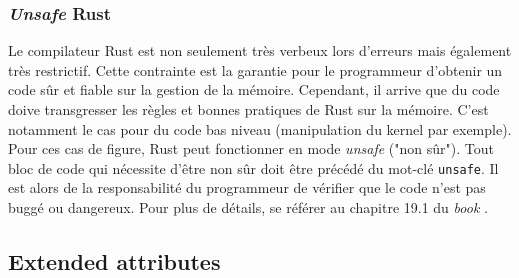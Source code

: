 \subsubsection{\textit{Unsafe} Rust}
Le compilateur Rust est non seulement très verbeux lors d'erreurs mais également très restrictif. 
Cette contrainte est la garantie pour le programmeur d'obtenir un code sûr et fiable sur la gestion 
de la mémoire. Cependant, il arrive que du code doive transgresser les règles et bonnes pratiques
de Rust sur la mémoire. C'est notamment le cas pour du code bas niveau (manipulation du kernel par 
exemple). Pour ces cas de figure, Rust peut fonctionner en mode \textit{unsafe} ("non sûr"). Tout 
bloc de code qui nécessite d'être non sûr doit être précédé du mot-clé \texttt{unsafe}. 
Il est alors de la responsabilité du programmeur de vérifier que le code n'est pas buggé ou dangereux.
Pour plus de détails, se référer au chapitre 19.1 du \textit{book} \cite{ref0}.

\subsection{Extended attributes}\label{extended_attributes}

